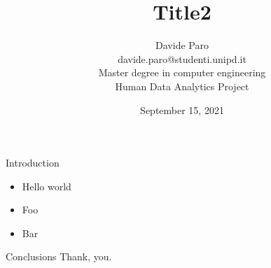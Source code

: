 \documentclass[a4paper]{beamer}
\title[Title 1]{Title2}
\author[Davide Paro]{Davide Paro\\davide.paro@studenti.unipd.it\\Master degree in computer engineering\\Human Data Analytics Project}
\date{September 15, 2021}
\begin{document}
%
\begin{frame}
	\maketitle
\end{frame}

\begin{frame}{Introduction}
	\begin{itemize}
		\item Hello world
		\item Foo
		\item Bar
	\end{itemize}
\end{frame}

\begin{frame}{Conclusions}
	Thank, you.
\end{frame}

\begin{frame}
	\maketitle
\end{frame}
\end{document}
